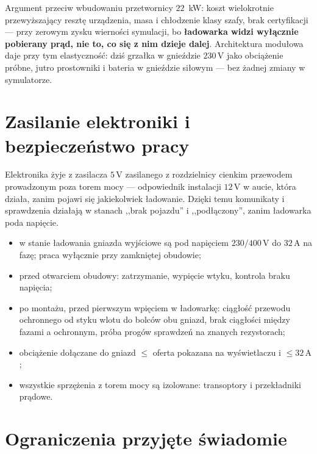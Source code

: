\documentclass[a4paper,11pt]{article}
\newcommand{\volt}{\,\mathrm{V}}
\newcommand{\amp}{\,\mathrm{A}}
\begin{document}
Argument przeciw wbudowaniu przetwornicy $22$~kW: koszt wielokrotnie przewyższający
resztę urządzenia, masa i chłodzenie klasy szafy, brak certyfikacji --- przy zerowym
zysku wierności symulacji, bo \textbf{ładowarka widzi wyłącznie pobierany prąd, nie
to, co się z nim dzieje dalej}. Architektura modułowa daje przy tym elastyczność:
dziś grzałka w gnieździe $230\volt$ jako obciążenie próbne, jutro prostowniki
i bateria w gnieździe siłowym --- bez żadnej zmiany w symulatorze.

\section{Zasilanie elektroniki i bezpieczeństwo pracy}

Elektronika żyje z zasilacza $5\volt$ zasilanego z rozdzielnicy cienkim przewodem
prowadzonym poza torem mocy --- odpowiednik instalacji $12\volt$ w aucie, która
działa, zanim pojawi się jakiekolwiek ładowanie. Dzięki temu komunikaty
i sprawdzenia działają w stanach ,,brak pojazdu'' i ,,podłączony'', zanim ładowarka
poda napięcie.

\begin{itemize}
\item w stanie ładowania gniazda wyjściowe są pod napięciem $230/400\volt$ do
      $32\amp$ na fazę; praca wyłącznie przy zamkniętej obudowie;
\item przed otwarciem obudowy: zatrzymanie, wypięcie wtyku, kontrola braku napięcia;
\item po montażu, przed pierwszym wpięciem w ładowarkę: ciągłość przewodu ochronnego
      od styku wlotu do bolców obu gniazd, brak ciągłości między fazami a ochronnym,
      próba progów sprawdzeń na znanych rezystorach;
\item obciążenie dołączane do gniazd $\le$ oferta pokazana na wyświetlaczu
      i $\le 32\amp$;
\item wszystkie sprzężenia z torem mocy są izolowane: transoptory i przekładniki
      prądowe.
\end{itemize}

\section{Ograniczenia przyjęte świadomie}
\end{document}

